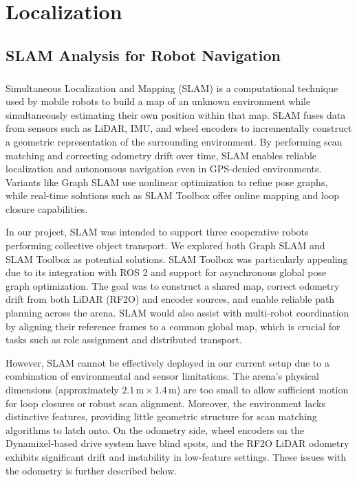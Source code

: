 \chapter{Localization}
\section*{SLAM Analysis for Robot Navigation}

\paragraph*{}
Simultaneous Localization and Mapping (SLAM) is a computational technique used by mobile robots to build a map of an unknown environment while simultaneously estimating their own position within that map. SLAM fuses data from sensors such as LiDAR, IMU, and wheel encoders to incrementally construct a geometric representation of the surrounding environment. By performing scan matching and correcting odometry drift over time, SLAM enables reliable localization and autonomous navigation even in GPS-denied environments. Variants like Graph SLAM use nonlinear optimization to refine pose graphs, while real-time solutions such as SLAM Toolbox offer online mapping and loop closure capabilities.

In our project, SLAM was intended to support three cooperative robots performing collective object transport. We explored both Graph SLAM and SLAM Toolbox as potential solutions. SLAM Toolbox was particularly appealing due to its integration with ROS 2 and support for asynchronous global pose graph optimization. The goal was to construct a shared map, correct odometry drift from both LiDAR (RF2O) and encoder sources, and enable reliable path planning across the arena. SLAM would also assist with multi-robot coordination by aligning their reference frames to a common global map, which is crucial for tasks such as role assignment and distributed transport.

However, SLAM cannot be effectively deployed in our current setup due to a combination of environmental and sensor limitations. The arena's physical dimensions (approximately $2.1 \, \text{m} \times 1.4 \, \text{m}$) are too small to allow sufficient motion for loop closures or robust scan alignment. Moreover, the environment lacks distinctive features, providing little geometric structure for scan matching algorithms to latch onto. On the odometry side, wheel encoders on the Dynamixel-based drive system have blind spots, and the RF2O LiDAR odometry exhibits significant drift and instability in low-feature settings. These issues with the odometry is further described below.


